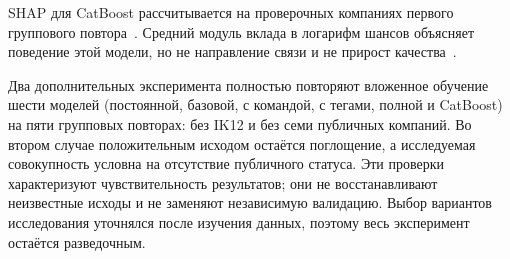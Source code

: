 SHAP для CatBoost рассчитывается на проверочных компаниях первого группового повтора~\cite{catboost-shap}. Средний модуль вклада в логарифм шансов объясняет поведение этой модели, но не направление связи и не прирост качества~\cite{shap-causality}.

Два дополнительных эксперимента полностью повторяют вложенное обучение шести моделей (постоянной, базовой, с командой, с тегами, полной и CatBoost) на пяти групповых повторах: без IK12 и без семи публичных компаний. Во втором случае положительным исходом остаётся поглощение, а исследуемая совокупность условна на отсутствие публичного статуса. Эти проверки характеризуют чувствительность результатов; они не восстанавливают неизвестные исходы и не заменяют независимую валидацию. Выбор вариантов исследования уточнялся после изучения данных, поэтому весь эксперимент остаётся разведочным.
\clearpage
